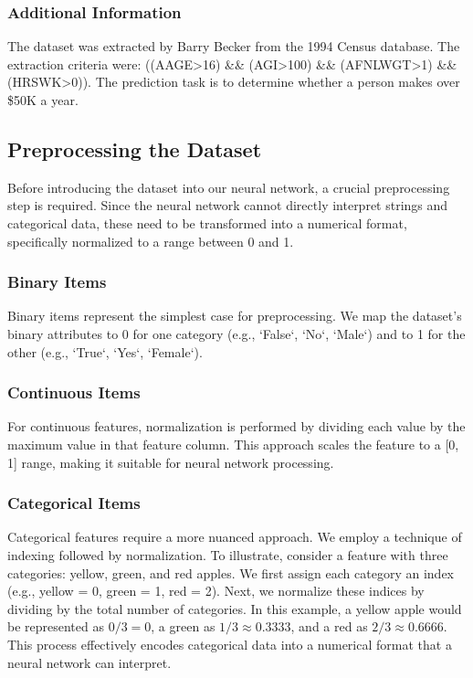 \documentclass{article}
\begin{document}
\subsubsection{Additional Information}

The dataset was extracted by Barry Becker from the 1994 Census database. The extraction criteria were: ((AAGE>16) \&\& (AGI>100) \&\& (AFNLWGT>1) \&\& (HRSWK>0)). The prediction task is to determine whether a person makes over \$50K a year.

\subsection{Preprocessing the Dataset}

Before introducing the dataset into our neural network, a crucial preprocessing step is required. Since the neural network cannot directly interpret strings and categorical data, these need to be transformed into a numerical format, specifically normalized to a range between 0 and 1.

\subsubsection{Binary Items}
Binary items represent the simplest case for preprocessing. We map the dataset's binary attributes to 0 for one category (e.g., `False`, `No`, `Male`) and to 1 for the other (e.g., `True`, `Yes`, `Female`).

\subsubsection{Continuous Items}
For continuous features, normalization is performed by dividing each value by the maximum value in that feature column. This approach scales the feature to a [0, 1] range, making it suitable for neural network processing.

\subsubsection{Categorical Items}
Categorical features require a more nuanced approach. We employ a technique of indexing followed by normalization. To illustrate, consider a feature with three categories: yellow, green, and red apples. We first assign each category an index (e.g., yellow = 0, green = 1, red = 2). Next, we normalize these indices by dividing by the total number of categories. In this example, a yellow apple would be represented as $0/3 = 0$, a green as $1/3 \approx 0.3333$, and a red as $2/3 \approx 0.6666$. This process effectively encodes categorical data into a numerical format that a neural network can interpret.
\end{document}
